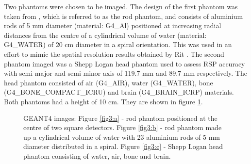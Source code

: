 \documentclass[11pt,a4paper]{article}
\begin{document}
Two phantoms were chosen to be imaged. The design of the first phantom was taken from \parencite{rit2015list}, which is referred to as the rod phantom, and consists of aluminium rods of 5 mm diameter (material: G4\_Al) positioned at increasing radial distances from the centre of a cylindrical volume of water (material: G4\_WATER) of 20 cm diameter in a spiral orientation. This was used in an effort to mimic the spatial resolution results obtained by Rit \parencite{rit2015list}. The second phantom imaged was a Shepp Logan head phantom used to assess RSP accuracy \parencite{shepp1974fourier} with semi major and semi minor axis of 119.7 mm and 89.7 mm respectively. The head phantom consisted of air (G4\_AIR), water (G4\_WATER), bone (G4\_BONE\_COMPACT\_ICRU) and brain (G4\_BRAIN\_ICRP) materials. Both phantoms had a height of 10 cm. They are shown in figure \ref{fig:phantom}.

\begin{figure}[htp]
  \centering
  \hspace{0.5em}%
  \hspace{0.5em}%
 \caption{GEANT4 images: Figure \ref{fig3:a} - rod phantom positioned at the centre of two square detectors. Figure \ref{fig3:b} - rod phantom made up a cylindrical volume of water with 23 aluminium rods of 5 mm diameter distributed in a spiral. Figure \ref{fig3:c} - Shepp Logan head phantom consisting of water, air, bone and brain.}
\label{fig:phantom}
\end{figure}
\end{document}
